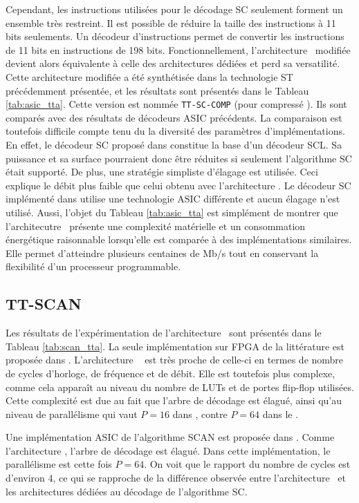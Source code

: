 Cependant, les instructions utilisées pour le décodage SC seulement forment un ensemble très restreint. Il est possible de réduire la taille des instructions à 11 bits seulements. Un décodeur d'instructions permet de convertir les instructions de 11 bits en instructions de 198 bits. Fonctionnellement, l'architecture \TTSC~modifiée devient alors équivalente à celle des architectures dédiées et perd sa versatilité. Cette architecture modifiée a été synthétisée dans la technologie ST précédemment présentée, et les résultats sont présentés dans le Tableau \ref{tab:asic_tta}. Cette version est nommée \texttt{TT-SC-COMP} (pour \og compressé \fg). Ils sont comparés avec des résultats de décodeurs ASIC précédents. La comparaison est toutefois difficile compte tenu du la diversité des paramètres d'implémentations. En effet, le décodeur SC proposé dans \cite{giard_polarbear:_2017} constitue la base d'un décodeur SCL. Sa puissance et sa surface pourraient donc être réduites si seulement l'algorithme SC était supporté. De plus, une stratégie simpliste d'élagage est utilisée. Ceci explique le débit plus faible que celui obtenu avec l'architecture \TTSC. Le décodeur SC implémenté dans \cite{mishra_successive_2012} utilise une technologie ASIC différente et aucun élagage n'est utilisé. Aussi, l'objet du Tableau \ref{tab:asic_tta} est simplément de montrer que l'architecutre \TTSC~présente une complexité matérielle et un consommation énergétique raisonnable lorsqu'elle est comparée à des implémentations similaires. Elle permet d'atteindre plusieurs centaines de Mb/s tout en conservant la flexibilité d'un processeur programmable.


\subsection{TT-SCAN}

Les résultats de l'expérimentation de l'architecture \TTSCAN~sont présentés dans le Tableau \ref{tab:scan_tta}. La seule implémentation sur FPGA de la littérature est proposée dans \cite{berhault_hardware_2015}. L'architecture \TTSCAN~ est très proche de celle-ci en termes de nombre de cycles d'horloge, de fréquence et de débit. Elle est toutefois plus complexe, comme cela apparaît au niveau du nombre de LUTs et de portes flip-flop utilisées. Cette complexité est due au fait que l'arbre de décodage est élagué, ainsi qu'au niveau de parallélisme qui vaut $P=16$ dans \cite{berhault_hardware_2015}, contre $P=64$ dans le \TTSCAN.

Une implémentation ASIC de l'algorithme SCAN est proposée dans \cite{lin_reduced_2015}. Comme l'architecture \TTSCAN, l'arbre de décodage est élagué. Dans cette implémentation, le parallélisme est cette fois $P=64$. On voit que le rapport du nombre de cycles est d'environ 4, ce qui se rapproche de la différence observée entre l'architecture \TTSC~et les architectures dédiées au décodage de l'algorithme SC.

